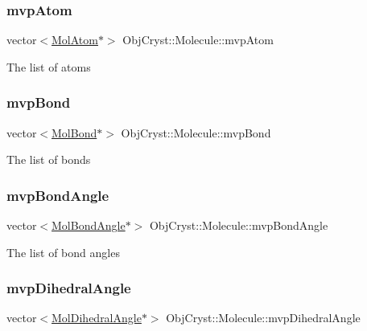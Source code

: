 \subsubsection{\texorpdfstring{mvpAtom}{mvpAtom}}
{\footnotesize\ttfamily vector$<$\mbox{\hyperlink{class_obj_cryst_1_1_mol_atom}{Mol\+Atom}}$\ast$$>$ Obj\+Cryst\+::\+Molecule\+::mvp\+Atom}

The list of atoms \mbox{\label{class_obj_cryst_1_1_molecule_aabf6e0daf6f90f4052a44888f2bc3d7b}} 
\subsubsection{\texorpdfstring{mvpBond}{mvpBond}}
{\footnotesize\ttfamily vector$<$\mbox{\hyperlink{class_obj_cryst_1_1_mol_bond}{Mol\+Bond}}$\ast$$>$ Obj\+Cryst\+::\+Molecule\+::mvp\+Bond}

The list of bonds \mbox{\label{class_obj_cryst_1_1_molecule_a9c195054308e17604a24a3127e0cb307}} 
\subsubsection{\texorpdfstring{mvpBondAngle}{mvpBondAngle}}
{\footnotesize\ttfamily vector$<$\mbox{\hyperlink{class_obj_cryst_1_1_mol_bond_angle}{Mol\+Bond\+Angle}}$\ast$$>$ Obj\+Cryst\+::\+Molecule\+::mvp\+Bond\+Angle}

The list of bond angles \mbox{\label{class_obj_cryst_1_1_molecule_a21384a0b8be7bf3fc539c57d90d5c9a2}} 
\subsubsection{\texorpdfstring{mvpDihedralAngle}{mvpDihedralAngle}}
{\footnotesize\ttfamily vector$<$\mbox{\hyperlink{class_obj_cryst_1_1_mol_dihedral_angle}{Mol\+Dihedral\+Angle}}$\ast$$>$ Obj\+Cryst\+::\+Molecule\+::mvp\+Dihedral\+Angle}

